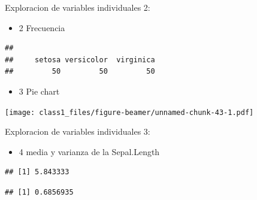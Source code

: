 \documentclass[ignorenonframetext,]{beamer}
\newenvironment{Shaded}{\begin{snugshade}}{\end{snugshade}}
\newcommand{\KeywordTok}[1]{\textcolor[rgb]{0.13,0.29,0.53}{\textbf{#1}}}
\newcommand{\OperatorTok}[1]{\textcolor[rgb]{0.81,0.36,0.00}{\textbf{#1}}}
\newcommand{\NormalTok}[1]{#1}
\providecommand{\tightlist}{%
  \setlength{\itemsep}{0pt}\setlength{\parskip}{0pt}}
\begin{document}
\begin{frame}[fragile]{Exploracion de variables individuales 2:}

\begin{itemize}
\tightlist
\item
  2 Frecuencia
\end{itemize}

\begin{Shaded}
\end{Shaded}

\begin{verbatim}
## 
##     setosa versicolor  virginica 
##         50         50         50
\end{verbatim}

\begin{itemize}
\tightlist
\item
  3 Pie chart
\end{itemize}

\begin{Shaded}
\end{Shaded}

\texttt{[image: class1\_files/figure-beamer/unnamed-chunk-43-1.pdf]}

\end{frame}

\begin{frame}[fragile]{Exploracion de variables individuales 3:}

\begin{itemize}
\tightlist
\item
  4 media y varianza de la Sepal.Length
\end{itemize}

\begin{Shaded}
\end{Shaded}

\begin{verbatim}
## [1] 5.843333
\end{verbatim}

\begin{Shaded}
\end{Shaded}

\begin{verbatim}
## [1] 0.6856935
\end{verbatim}

\end{frame}
\end{document}

